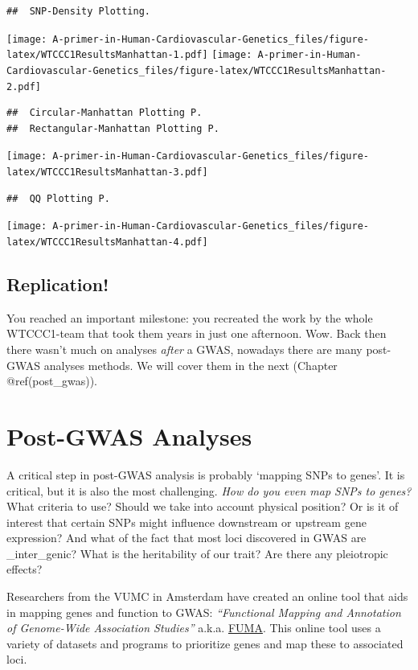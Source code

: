 \documentclass[
]{book}
\begin{document}
\begin{verbatim}
##  SNP-Density Plotting.
\end{verbatim}

\texttt{[image: A-primer-in-Human-Cardiovascular-Genetics\_files/figure-latex/WTCCC1ResultsManhattan-1.pdf]} \texttt{[image: A-primer-in-Human-Cardiovascular-Genetics\_files/figure-latex/WTCCC1ResultsManhattan-2.pdf]}

\begin{verbatim}
##  Circular-Manhattan Plotting P.
##  Rectangular-Manhattan Plotting P.
\end{verbatim}

\texttt{[image: A-primer-in-Human-Cardiovascular-Genetics\_files/figure-latex/WTCCC1ResultsManhattan-3.pdf]}

\begin{verbatim}
##  QQ Plotting P.
\end{verbatim}

\texttt{[image: A-primer-in-Human-Cardiovascular-Genetics\_files/figure-latex/WTCCC1ResultsManhattan-4.pdf]}

\hypertarget{replication}{%
\section{Replication!}\label{replication}}

You reached an important milestone: you recreated the work by the whole WTCCC1-team that took them years in just one afternoon. Wow. Back then there wasn't much on analyses \emph{after} a GWAS, nowadays there are many post-GWAS analyses methods. We will cover them in the next (Chapter @ref(post\_gwas)).

\hypertarget{post-gwas-analyses}{%
\chapter{Post-GWAS Analyses}\label{post-gwas-analyses}}

A critical step in post-GWAS analysis is probably `mapping SNPs to genes'. It is critical, but it is also the most challenging. \emph{How do you even map SNPs to genes?} What criteria to use? Should we take into account physical position? Or is it of interest that certain SNPs might influence downstream or upstream gene expression? And what of the fact that most loci discovered in GWAS are \_inter\_genic? What is the heritability of our trait? Are there any pleiotropic effects?

Researchers from the VUMC in Amsterdam have created an online tool that aids in mapping genes and function to GWAS: \emph{``Functional Mapping and Annotation of Genome-Wide Association Studies''} a.k.a. \href{https://fuma.ctglab.nl}{FUMA}. This online tool uses a variety of datasets and programs to prioritize genes and map these to associated loci.
\end{document}
